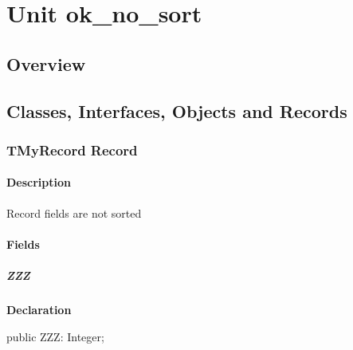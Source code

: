 \documentclass{report}
\begin{document}
\newlength{\tmplength}
\chapter{Unit ok{\_}no{\_}sort}
\section{Overview}
\begin{description}
\item[\texttt{\begin{ttfamily}TMyRecord\end{ttfamily} Record}]
\item[\texttt{\begin{ttfamily}TMyClass\end{ttfamily} Class}]
\end{description}
\section{Classes, Interfaces, Objects and Records}
\subsection*{TMyRecord Record}
\subsubsection*{\large{\textbf{Description}}\normalsize\hspace{1ex}\hfill}
Record fields are not sorted\subsubsection*{\large{\textbf{Fields}}\normalsize\hspace{1ex}\hfill}
\paragraph*{ZZZ}\hspace*{\fill}

\begin{list}{}{
\setlength{\itemindent}{0cm}
\setlength{\listparindent}{0cm}
\setlength{\leftmargin}{\evensidemargin}
\addtolength{\leftmargin}{\tmplength}
\settowidth{\labelsep}{X}
\addtolength{\leftmargin}{\labelsep}
\setlength{\labelwidth}{\tmplength}
}
\begin{flushleft}
\item[\textbf{Declaration}\hfill]
\begin{ttfamily}
public ZZZ: Integer;\end{ttfamily}


\end{flushleft}
\end{list}
\end{document}

